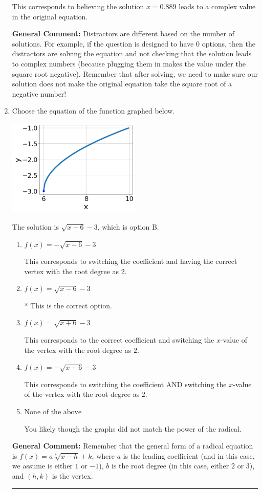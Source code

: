 \documentclass{extbook}[14pt]
\newcommand{\litem}[1]{\item #1

\rule{\textwidth}{0.4pt}}
\begin{document}
\begin{enumerate}
{\begin{enumerate}[label=\Alph*.]
This corresponds to believing the solution $x = 0.889$ leads to a complex value in the original equation.
\end{enumerate}

\textbf{General Comment:} Distractors are different based on the number of solutions. For example, if the question is designed to have 0 options, then the distractors are solving the equation and not checking that the solution leads to complex numbers (because plugging them in makes the value under the square root negative). Remember that after solving, we need to make sure our solution does not make the original equation take the square root of a negative number!
}
\litem{
Choose the equation of the function graphed below.

\begin{center}
    \includegraphics[width=0.5\textwidth]{../Figures/radicalGraphToEquationA.png}
\end{center}




The solution is \( \sqrt{x - 6} - 3 \), which is option B.\begin{enumerate}[label=\Alph*.]
\item \( f(x) = - \sqrt{x - 6} - 3 \)

This corresponds to switching the coefficient and having the correct vertex with the root degree as $2$.
\item \( f(x) = \sqrt{x - 6} - 3 \)

* This is the correct option.
\item \( f(x) = \sqrt{x + 6} - 3 \)

This corresponds to the correct coefficient and switching the $x$-value of the vertex with the root degree as $2$.
\item \( f(x) = - \sqrt{x + 6} - 3 \)

This corresponds to switching the coefficient AND switching the $x$-value of the vertex with the root degree as $2$.
\item \( \text{None of the above} \)

You likely though the graphs did not match the power of the radical.
\end{enumerate}

\textbf{General Comment:} Remember that the general form of a radical equation is $ f(x) = a \sqrt[b]{x - h} + k$, where $a$ is the leading coefficient (and in this case, we assume is either $1$ or $-1$), $b$ is the root degree (in this case, either $2$ or $3$), and $(h, k)$ is the vertex.
}
\end{enumerate}
\end{document}

